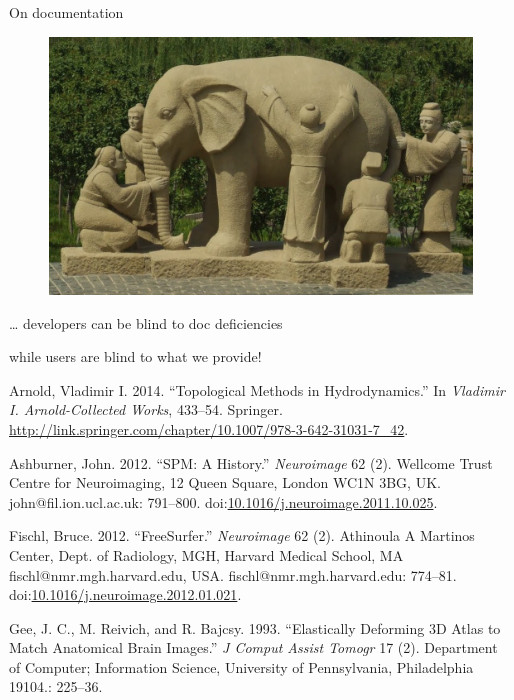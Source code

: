 \documentclass[ignorenonframetext,]{beamer}
\begin{document}
\begin{frame}{On documentation}

\begin{figure}[htbp]
\centering
\includegraphics{figures/blindmen.jpg}
\caption{}
\end{figure}

\ldots{} developers can be blind to doc deficiencies

while users are blind to what we provide!

\hypertarget{refs}{}
\hypertarget{ref-Arnold2014}{}
Arnold, Vladimir I. 2014. ``Topological Methods in Hydrodynamics.'' In
\emph{Vladimir I. Arnold-Collected Works}, 433--54. Springer.
\url{http://link.springer.com/chapter/10.1007/978-3-642-31031-7_42}.

\hypertarget{ref-Ashburner2012}{}
Ashburner, John. 2012. ``SPM: A History.'' \emph{Neuroimage} 62 (2).
Wellcome Trust Centre for Neuroimaging, 12 Queen Square, London WC1N
3BG, UK. john@fil.ion.ucl.ac.uk: 791--800.
doi:\href{https://doi.org/10.1016/j.neuroimage.2011.10.025}{10.1016/j.neuroimage.2011.10.025}.

\hypertarget{ref-Fischl2012}{}
Fischl, Bruce. 2012. ``FreeSurfer.'' \emph{Neuroimage} 62 (2). Athinoula
A Martinos Center, Dept. of Radiology, MGH, Harvard Medical School, MA
fischl@nmr.mgh.harvard.edu, USA. fischl@nmr.mgh.harvard.edu: 774--81.
doi:\href{https://doi.org/10.1016/j.neuroimage.2012.01.021}{10.1016/j.neuroimage.2012.01.021}.

\hypertarget{ref-Gee1993}{}
Gee, J. C., M. Reivich, and R. Bajcsy. 1993. ``Elastically Deforming 3D
Atlas to Match Anatomical Brain Images.'' \emph{J Comput Assist Tomogr}
17 (2). Department of Computer; Information Science, University of
Pennsylvania, Philadelphia 19104.: 225--36.


\end{frame}
\end{document}
